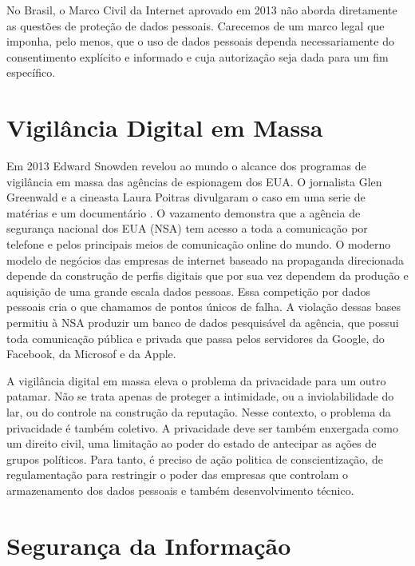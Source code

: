 No Brasil, o Marco Civil da Internet aprovado em 2013 não aborda diretamente as questões de proteção de dados pessoais.
Carecemos de um marco legal que imponha, pelo menos, que o uso de dados pessoais dependa necessariamente do consentimento explícito e informado e cuja autorização seja dada para um fim específico.

\section{Vigilância Digital em Massa}
\label{sec:vigil-digital}

Em 2013 Edward Snowden revelou ao mundo o alcance dos programas de vigilância em massa das agências de espionagem dos EUA.
O jornalista Glen Greenwald e a cineasta Laura Poitras divulgaram o caso em uma serie de matérias e um documentário \cite{Greenwald14, Poitras14}.
O vazamento demonstra que a agência de segurança nacional dos EUA (NSA) tem acesso a toda a comunicação por telefone e pelos principais meios de comunicação online do mundo.
O moderno modelo de negócios das empresas de internet baseado na propaganda direcionada depende da construção de perfis digitais que por sua vez dependem da produção e aquisição de uma grande escala dados pessoas.
Essa competição por dados pessoais cria o que chamamos de pontos únicos de falha.
A violação dessas bases permitiu à NSA produzir um banco de dados pesquisável da agência, que possui toda comunicação pública e privada que passa pelos servidores da Google, do Facebook, da Microsof e da Apple.

A vigilância digital em massa eleva o problema da privacidade para um outro patamar.
Não se trata apenas de proteger a intimidade, ou a inviolabilidade do lar, ou do controle na construção da reputação. 
Nesse contexto, o problema da privacidade é também coletivo.
A privacidade deve ser também enxergada como um direito civil, uma limitação ao poder do estado de antecipar as ações de grupos políticos. 
Para tanto, é preciso de ação politica de conscientização, de regulamentação para restringir o poder das empresas que controlam o armazenamento dos dados pessoais e também desenvolvimento técnico. 

\section{Segurança da Informação}
\label{sec:seg-inf}

